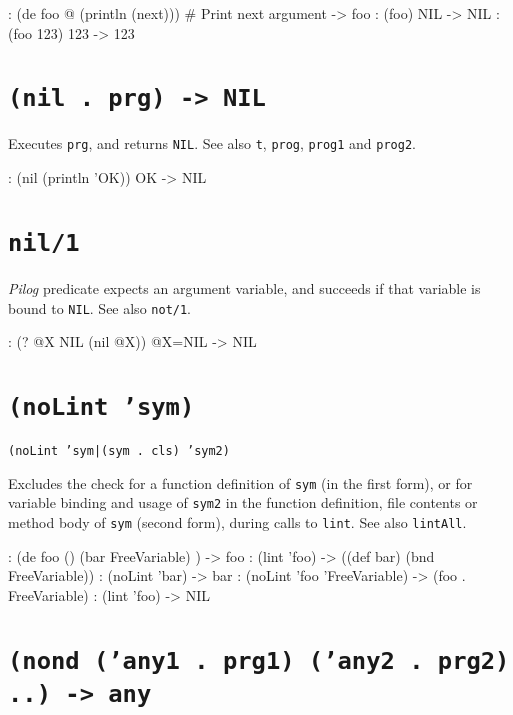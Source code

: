 \begin{wideverbatim}
: (de foo @ (println (next)))          # Print next argument
-> foo
: (foo)
NIL
-> NIL
: (foo 123)
123
-> 123
\end{wideverbatim}

 
\section*{\texttt{(nil . prg) -> NIL}}
\label{sec:func-ref-N-(nil . prg) -> NIL}


Executes \texttt{prg}, and returns \texttt{NIL}. See also \texttt{t}, \texttt{prog}, \texttt{prog1} and
\texttt{prog2}.


\begin{wideverbatim}
: (nil (println 'OK))
OK
-> NIL
\end{wideverbatim}

 
\section*{\texttt{nil/1}}
\label{sec:func-ref-N-nil/1}


\emph{Pilog} predicate expects an argument variable, and
succeeds if that variable is bound to \texttt{NIL}. See also \texttt{not/1}.


\begin{wideverbatim}
: (? @X NIL (nil @X))
 @X=NIL
-> NIL
\end{wideverbatim}

 
\section*{\texttt{(noLint 'sym)}}
\label{sec:func-ref-N-(noLint 'sym)}


\texttt{(noLint 'sym|(sym . cls) 'sym2)}

Excludes the check for a function definition of \texttt{sym} (in the first
form), or for variable binding and usage of \texttt{sym2} in the function
definition, file contents or method body of \texttt{sym} (second form), during
calls to \texttt{lint}. See also \texttt{lintAll}.


\begin{wideverbatim}
: (de foo ()
   (bar FreeVariable) )
-> foo
: (lint 'foo)
-> ((def bar) (bnd FreeVariable))
: (noLint 'bar)
-> bar
: (noLint 'foo 'FreeVariable)
-> (foo . FreeVariable)
: (lint 'foo)
-> NIL
\end{wideverbatim}

 
\section*{\texttt{(nond ('any1 . prg1) ('any2 . prg2) ..) -> any}}
\label{sec:func-ref-N-(nond ('any1 . prg1) ('any2 . prg2) ..) -> any}


